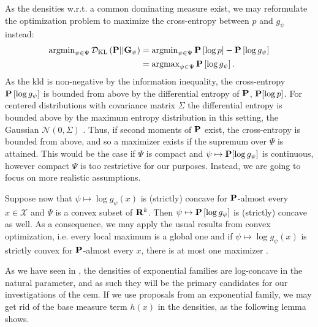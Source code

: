 As the densities w.r.t. a common dominating measure exist, we may reformulate the optimization problem to maximize the cross-entropy between $p$ and $g_{\psi}$ instead:
\begin{align}
    \begin{split}
    \argmin_{\psi \in \Psi} \Dkl{\P}{\G_{\psi}} &=  \argmin_{\psi \in \Psi} \P \left[\log p \right] - \P \left[\log g_{\psi}\right] \\
    &= \argmax_{\psi \in \Psi} \P \left[\log g_{\psi}\right].
    \end{split} \label{eq:ce_argmax}
\end{align}
As the \acrshort{kld} is non-negative by the information inequality, the cross-entropy $\P \left[ \log g_{\psi} \right]$ is bounded from above by the differential entropy of $\P$, $\P [\log p]$. For centered distributions with covariance matrix $\Sigma$ the differential entropy is bounded above by the maximum entropy distribution in this setting, the Gaussian $\mathcal N(0, \Sigma)$ \citep[Example 12.2.8]{Cover2006Elements}. Thus, if second moments of $\P$ exist, the cross-entropy is bounded from above, and so a maximizer exists if the supremum over $\Psi$ is attained. This would be the case if $\Psi$ is compact and $\psi \mapsto \P [\log g_{\psi}]$ is continuous, however compact $\Psi$ is too restrictive for our purposes. Instead, we are going to focus on more realistic assumptions.

Suppose now that $\psi \mapsto \log g_{\psi}(x)$ is (strictly) concave for $\P$-almost every $x \in \mathcal X$ and $\Psi$ is a convex subset of $\R^{k}$. Then $\psi \mapsto \P \left[\log g_{\psi}\right]$ is (strictly) concave as well. As a consequence, we may apply the usual results from convex optimization, i.e. every local maximum is a global one and if $\psi \mapsto \log g_{\psi}(x)$ is strictly convex for $\P$-almost every $x$, there is at most one maximizer \citep[Theorem 3.4.2]{Bazaraa2006Nonlinear}.

As we have seen in , the densities of exponential families are log-concave in the natural parameter, and as such they will be the primary candidates for our investigations of the \acrshort{cem}. 
If we use proposals from an exponential family, we may get rid of the base measure term $h(x)$ in the densities, as the following lemma shows.

